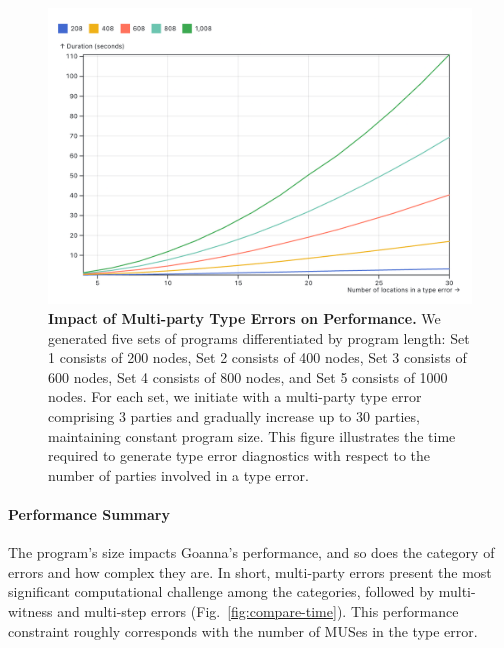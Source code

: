 \documentclass[pdflatex,lineno,sn-nature,Numbered]{sn-jnl}%
\begin{document}
\begin{figure}[ht]
    \centering
    \includegraphics[width=0.8\linewidth]{images/multi-party-time.png}
    \caption{{\bf Impact of Multi-party Type Errors on Performance.} We generated five sets of programs differentiated by program length: Set 1 consists of 200 nodes, Set 2 consists of 400 nodes, Set 3 consists of 600 nodes, Set 4 consists of 800 nodes, and Set 5 consists of 1000 nodes. For each set, we initiate with a multi-party type error comprising 3 parties and gradually increase up to 30 parties, maintaining constant program size. This figure illustrates the time required to generate type error diagnostics with respect to the number of parties involved in a type error. }
    
    \label{fig:multi-party-time}
\end{figure}

\paragraph{Performance Summary}
The program's size impacts Goanna's performance, and so does the category of errors and how complex they are. In short, multi-party errors present the most significant computational challenge among the categories, followed by multi-witness and multi-step errors (Fig.~\ref{fig:compare-time}). This performance constraint roughly corresponds with the number of MUSes in the type error. 
\end{document}

